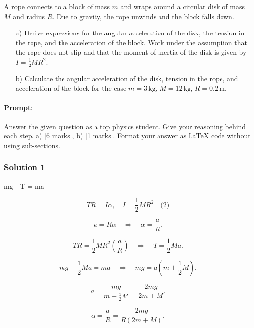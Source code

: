 \documentclass{article}
\begin{document}
A rope connects to a block of mass $m$ and wraps around a circular disk of mass $M$ and radius $R$. Due to gravity, the rope unwinds and the block falls down.

\begin{itemize}
    \item[a)] Derive expressions for the angular acceleration of the disk, the tension in the rope, and the acceleration of the block. Work under the assumption that the rope does not slip and that the moment of inertia of the disk is given by $I = \frac{1}{2} M R^2$.
    
    \item[b)] Calculate the angular acceleration of the disk, tension in the rope, and acceleration of the block for the case $m = 3\, \text{kg}$, $M = 12\, \text{kg}$, $R = 0.2\, \text{m}$.
\end{itemize}


\paragraph{Prompt: \\} 
Answer the given question as a top physics student. Give your reasoning behind each step. a) [6 marks], b) [1 marks].
Format your answer as LaTeX code without using sub-sections.


\subsubsection{Solution 1}
mg - T = ma \quad {}

\[T R = I \alpha, \quad I = \frac{1}{2} M R^2 \quad \text{(2)}\]

\[a = R \alpha \quad \Rightarrow \quad \alpha = \frac{a}{R}.\]

\[T R = \frac{1}{2} M R^2 \left(\frac{a}{R}\right)
\quad \Rightarrow \quad T = \frac{1}{2} M a.\]

\[mg - \frac{1}{2} M a = m a \quad \Rightarrow \quad mg = a \left(m + \frac{1}{2} M\right).\]

\[a = \frac{mg}{m + \frac{1}{2} M} = \frac{2mg}{2m + M}.\]

\[\alpha = \frac{a}{R} = \frac{2mg}{R(2m + M)}.\]
\end{document}
